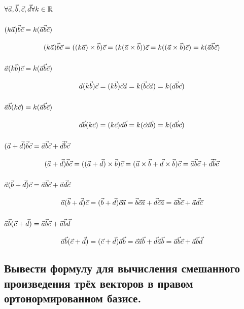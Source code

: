 \begin{center}
    $\forall \a, \b, \c,\d \forall k \in \mathbb{R}$
\end{center}

\subsubsection{$(k\a)\b\c = k(\a\b\c)$}
$$(k\a)\b\c = ((k\a)\times\b)\c = (k(\a\times\b))\c = k((\a\times\b)\c) = k(\a\b\c)$$

\subsubsection{$\a(k\b)\c = k(\a\b\c)$}
$$\a(k\b)\c = (k\b)\c\a = k(\b\c\a) = k(\a\b\c)$$

\subsubsection{$\a\b(k\c) = k(\a\b\c)$}
$$\a\b(k\c) = (k\c)\a\b = k(\c\a\b) = k(\a\b\c)$$

\subsubsection{$(\a+\d)\b\c = \a\b\c + \d\b\c$}
$$(\a+\d)\b\c = ((\a+\d)\times\b)\c = (\a\times\b+\d\times\b)\c = \a\b\c+\d\b\c$$

\subsubsection{$\a(\b+\d)\c = \a\b\c + \a\d\c$}
$$\a(\b+\d)\c = (\b+\d)\c\a = \b\c\a + \d\c\a = \a\b\c + \a\d\c$$

\subsubsection{$\a\b(\c+\d) = \a\b\c + \a\b\d$}
$$\a\b(\c+\d) = (\c+\d)\a\b = \c\a\b+\d\a\b = \a\b\c + \a\b\d$$

\subsection{Вывести формулу для вычисления смешанного произведения трёх векторов в правом ортонормированном базисе.}


